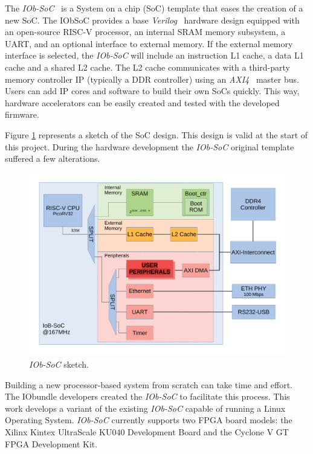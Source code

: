 The \textit{IOb-SoC}~\cite{iob_soc} is a System on a chip (SoC) template that eases the creation of a new SoC. The IObSoC provides a base \textit{Verilog}~\cite{thomas2008verilog} hardware design equipped with an open-source RISC-V processor, an internal SRAM memory subsystem, a UART, and an optional interface to external memory. If the external memory interface is selected, the \textit{IOb-SoC} will include an instruction L1 cache, a data L1 cache and a shared L2 cache. The L2 cache communicates with a third-party memory controller IP (typically a DDR controller) using an \textit{AXI4}~\cite{tidala2018high} master bus. Users can add IP cores and software to build their own SoCs quickly. This way, hardware accelerators can be easily created and tested with the developed firmware.

Figure \ref{fig:bd_original} represents a sketch of the SoC design. This design is valid at the start of this project. During the hardware development the \textit{IOb-SoC} original template suffered a few alterations.

\begin{figure}[!ht]
  \centering
  \includegraphics[width=\linewidth]{../images/bd_original.pdf}
  \caption{\textit{IOb-SoC} sketch.}
  \label{fig:bd_original}
\end{figure}

Building a new processor-based system from scratch can take time and effort. The IObundle developers created the \textit{IOb-SoC} to facilitate this process. This work develops a variant of the existing \textit{IOb-SoC} capable of running a Linux Operating System. \textit{IOb-SoC} currently supports two FPGA board models: the Xilinx Kintex UltraScale KU040 Development Board and the Cyclone V GT FPGA Development Kit.


